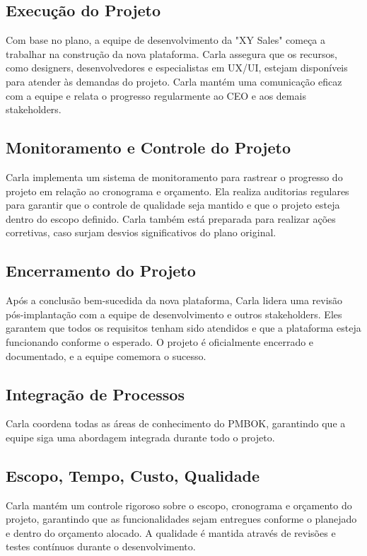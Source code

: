 \documentclass[
	12pt,				%
	openright,			%
	twoside,			%
	a4paper,			%
	english,			%
	brazil				%
	]{abntex2}
\begin{document}
\subsection{Execução do Projeto}
Com base no plano, a equipe de desenvolvimento da "XY Sales" começa a trabalhar na construção da nova plataforma. Carla assegura que os recursos, como designers, desenvolvedores e especialistas em UX/UI, estejam disponíveis para atender às demandas do projeto. Carla mantém uma comunicação eficaz com a equipe e relata o progresso regularmente ao CEO e aos demais stakeholders.

\subsection{Monitoramento e Controle do Projeto}
Carla implementa um sistema de monitoramento para rastrear o progresso do projeto em relação ao cronograma e orçamento. Ela realiza auditorias regulares para garantir que o controle de qualidade seja mantido e que o projeto esteja dentro do escopo definido. Carla também está preparada para realizar ações corretivas, caso surjam desvios significativos do plano original.

\subsection{Encerramento do Projeto}
Após a conclusão bem-sucedida da nova plataforma, Carla lidera uma revisão pós-implantação com a equipe de desenvolvimento e outros stakeholders. Eles garantem que todos os requisitos tenham sido atendidos e que a plataforma esteja funcionando conforme o esperado. O projeto é oficialmente encerrado e documentado, e a equipe comemora o sucesso.

\subsection{Integração de Processos}
Carla coordena todas as áreas de conhecimento do PMBOK, garantindo que a equipe siga uma abordagem integrada durante todo o projeto.

\subsection{Escopo, Tempo, Custo, Qualidade}
Carla mantém um controle rigoroso sobre o escopo, cronograma e orçamento do projeto, garantindo que as funcionalidades sejam entregues conforme o planejado e dentro do orçamento alocado. A qualidade é mantida através de revisões e testes contínuos durante o desenvolvimento.
\end{document}
